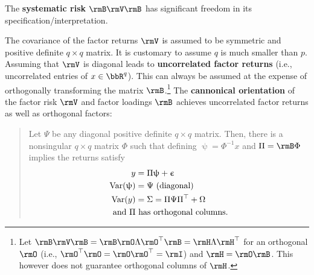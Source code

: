 \documentclass[leqno,12pt]{article}
\begin{document}
{The {\bf systematic risk} $\rmB \rmV \rmB$ has significant
freedom in its specification/interpretation. 

\begin{mdframed}[style=clean]
The covariance of the factor returns $\rmV$ is assumed to 
be symmetric and positive definite $q\times q$ matrix. 
It is customary to assume $q$ is much smaller than $p$. Assuming 
that $\rmV$ is diagonal leads to {\bf uncorrelated
factor returns} (i.e., uncorrelated entries of $x \in \bbR^q$).
This can always
be assumed at the expense of orthogonally
transforming the matrix $\rmB$.\footnote{Let
$\rmB \rmV \rmB = \rmB \rmO \Lambda \rmO^\top \rmB
= \rmH \Lambda \rmH^\top$
for an orthogonal $\rmO$ (i.e., $\rmO^\top
\rmO = \rmO \rmO^\top = \rmI$) and $\rmH = \rmO \rmB$. 
This however does not guarantee orthogonal columns of 
$\rmH$.} The {\bf cannonical orientation} of the 
factor risk $\rmV$ and factor loadings $\rmB$ achieves
uncorrelated factor returns as well as orthogonal factors:
\begin{quote}
  Let $\Psi$ be any diagonal positive definite $q \times q$
matrix. Then, there is a nonsingular $q \times q$ matrix 
$\Phi$ such
that defining $\uppsi = \Phi^{-1} x$ and $\Pi = \rmB \Phi$ 
implies the returns satisfy
\begin{equation}  \label{canonical}
\begin{aligned}
  y &= \Pi \uppsi + \upepsilon \\
  \textup{Var}(\uppsi) &= \Psi \text{ (diagonal)}\\  
  \textup{Var}(y) &= \Sigma = \Pi \Psi \Pi^\top + \Omega \\
\text{and } \Pi &\text{ has orthogonal columns.}
\end{aligned}
\end{equation}
\end{quote}
\end{mdframed}

}
\end{document}

